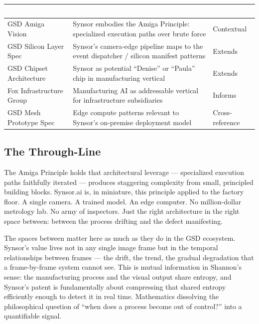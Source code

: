 \documentclass[11pt,letterpaper]{article}
\newcommand{\tableheader}[1]{\textbf{\sffamily\textcolor{white}{#1}}}
\begin{document}
\begin{center}
\begin{tabularx}{\textwidth}{L{4cm}XC{2.5cm}}
\toprule
{}
\tableheader{Document} & \tableheader{Relationship} & \tableheader{Direction} \\
\midrule
GSD Amiga Vision & Synsor embodies the Amiga Principle: specialized execution paths over brute force & Contextual \\
GSD Silicon Layer Spec & Synsor's camera-edge pipeline maps to the event dispatcher / silicon manifest patterns & Extends \\
GSD Chipset Architecture & Synsor as potential ``Denise'' or ``Paula'' chip in manufacturing vertical & Extends \\
Fox Infrastructure Group & Manufacturing AI as addressable vertical for infrastructure subsidiaries & Informs \\
GSD Mesh Prototype Spec & Edge compute patterns relevant to Synsor's on-premise deployment model & Cross-reference \\
\bottomrule
\end{tabularx}
\end{center}

\subsection{The Through-Line}

The Amiga Principle holds that architectural leverage --- specialized execution paths faithfully iterated --- produces staggering complexity from small, principled building blocks. Synsor.ai is, in miniature, this principle applied to the factory floor. A single camera. A trained model. An edge computer. No million-dollar metrology lab. No army of inspectors. Just the right architecture in the right space between: between the process drifting and the defect manifesting.

The spaces between matter here as much as they do in the GSD ecosystem. Synsor's value lives not in any single image frame but in the temporal relationships between frames --- the drift, the trend, the gradual degradation that a frame-by-frame system cannot see. This is mutual information in Shannon's sense: the manufacturing process and the visual output share entropy, and Synsor's patent is fundamentally about compressing that shared entropy efficiently enough to detect it in real time. Mathematics dissolving the philosophical question of ``when does a process become out of control?'' into a quantifiable signal.
\end{document}
